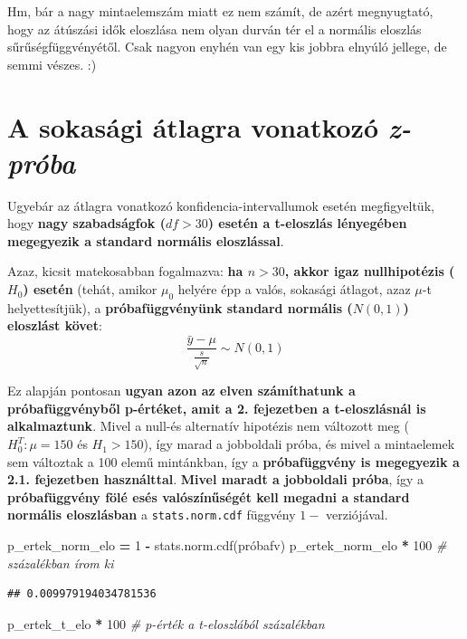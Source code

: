 \documentclass[
]{book}
\newenvironment{Shaded}{\begin{snugshade}}{\end{snugshade}}
\newcommand{\CommentTok}[1]{\textcolor[rgb]{0.56,0.35,0.01}{\textit{#1}}}
\newcommand{\DecValTok}[1]{\textcolor[rgb]{0.00,0.00,0.81}{#1}}
\newcommand{\NormalTok}[1]{#1}
\newcommand{\OperatorTok}[1]{\textcolor[rgb]{0.81,0.36,0.00}{\textbf{#1}}}
\begin{document}
Hm, bár a nagy mintaelemszám miatt ez nem számít, de azért megnyugtató, hogy az átúszási idők eloszlása nem olyan durván tér el a normális eloszlás sűrűségfüggvényétől. Csak nagyon enyhén van egy kis jobbra elnyúló jellege, de semmi vészes. :)

\section{\texorpdfstring{A sokasági átlagra vonatkozó \emph{z-próba}}{A sokasági átlagra vonatkozó z-próba}}\label{a-sokasuxe1gi-uxe1tlagra-vonatkozuxf3-z-pruxf3ba}

Ugyebár az átlagra vonatkozó konfidencia-intervallumok esetén megfigyeltük, hogy \textbf{nagy szabadságfok (\(df>30\)) esetén a t-eloszlás lényegében megegyezik a standard normális eloszlással}.

Azaz, kicsit matekosabban fogalmazva: \textbf{ha \(n >30\), akkor igaz nullhipotézis (\(H_0\)) esetén} (tehát, amikor \(\mu_0\) helyére épp a valós, sokasági átlagot, azaz \(\mu\)-t helyettesítjük), a \textbf{próbafüggvényünk standard normális (\(N(0,1)\)) eloszlást követ}: \[\frac{\bar{y}-\mu}{\frac{s}{\sqrt{n}}} \sim N(0,1)\]

Ez alapján pontosan \textbf{ugyan azon az elven számíthatunk a próbafüggvényből p-értéket, amit a 2. fejezetben a t-eloszlásnál is alkalmaztunk}. Mivel a null-és alternatív hipotézis nem változott meg (\(H_0^T:\mu=150\) és \(H_1 > 150\)), így marad a jobboldali próba, és mivel a mintaelemek sem változtak a 100 elemű mintánkban, így a \textbf{próbafüggvény is megegyezik a 2.1. fejezetben használttal}.
\textbf{Mivel maradt a jobboldali próba}, így a \textbf{próbafüggvény fölé esés valószínűségét kell megadni a standard normális eloszlásban} a \texttt{stats.norm.cdf} függvény \(1-\) verziójával.

\begin{Shaded}
\begin{Highlighting}[]
\NormalTok{p\_ertek\_norm\_elo }\OperatorTok{=} \DecValTok{1} \OperatorTok{{-}}\NormalTok{ stats.norm.cdf(próbafv)}
\NormalTok{p\_ertek\_norm\_elo }\OperatorTok{*} \DecValTok{100} \CommentTok{\# százalékban írom ki}
\end{Highlighting}
\end{Shaded}

\begin{verbatim}
## 0.009979194034781536
\end{verbatim}

\begin{Shaded}
\begin{Highlighting}[]
\NormalTok{p\_ertek\_t\_elo }\OperatorTok{*} \DecValTok{100} \CommentTok{\# p{-}érték a t{-}eloszlából százalékban}
\end{Highlighting}
\end{Shaded}
\end{document}
